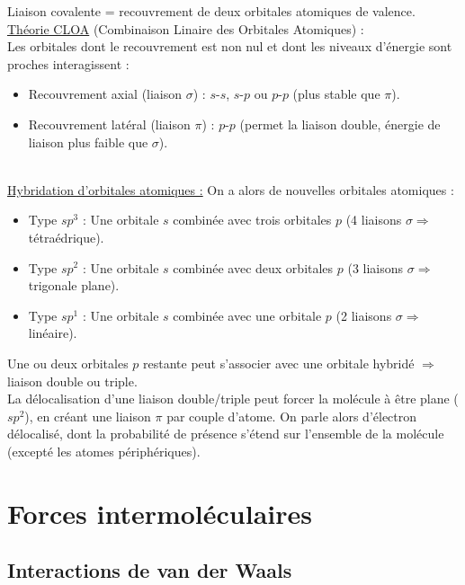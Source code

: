 \documentclass[13pt, twoside, a4paper, french, tikz]{report}
\begin{document}
    Liaison covalente = recouvrement de deux orbitales atomiques de valence.\\

    \underline{Théorie CLOA} (Combinaison Linaire des Orbitales Atomiques) :\\

    Les orbitales dont le recouvrement est non nul et dont les niveaux d'énergie sont proches interagissent :
    \begin{itemize}
        \item Recouvrement axial (liaison $\sigma$) : $s$-$s$, $s$-$p$ ou $p$-$p$ (plus stable que $\pi$).
        \item Recouvrement latéral (liaison $\pi$) : $p$-$p$ (permet la liaison double, énergie de liaison plus faible que $\sigma$).
    \end{itemize}
    \ \\
    \underline{Hybridation d'orbitales atomiques :} On a alors de nouvelles orbitales atomiques :
    \begin{itemize}
        \item Type $sp^3$ : Une orbitale $s$ combinée avec trois orbitales $p$ (4 liaisons $\sigma \Rightarrow$ tétraédrique).
        \item Type $sp^2$ : Une orbitale $s$ combinée avec deux orbitales $p$ (3 liaisons $\sigma \Rightarrow$ trigonale plane).
        \item Type $sp^1$ : Une orbitale $s$ combinée avec une orbitale $p$ (2 liaisons $\sigma \Rightarrow$ linéaire).
    \end{itemize}
    Une ou deux orbitales $p$ restante peut s'associer avec une orbitale hybridé $\Rightarrow$ liaison double ou triple.\\

    La délocalisation d'une liaison double/triple peut forcer la molécule à être plane ($sp^2$), en créant une liaison $\pi$ par couple d'atome.
    On parle alors d'électron délocalisé, dont la probabilité de présence s'étend sur l'ensemble de la molécule (excepté les atomes périphériques).


    \chapter{Forces intermoléculaires}\label{ch:forces-intermoleculaires}


    \section{Interactions de van der Waals}\label{sec:interactions-de-van-der-waals}
\end{document}
